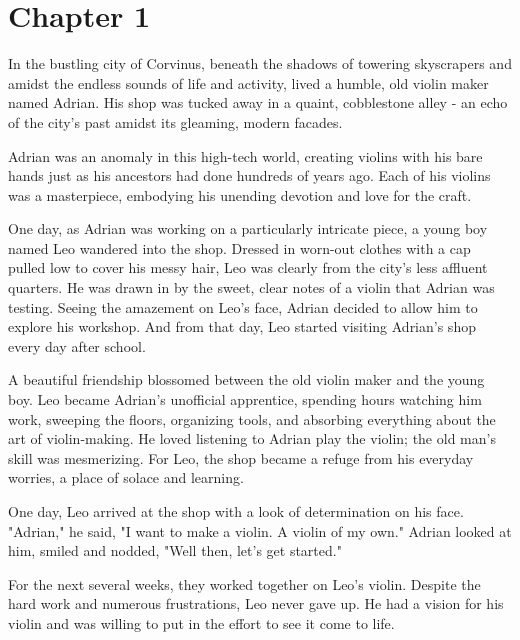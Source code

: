 \section{Chapter 1}
In the bustling city of Corvinus, beneath the shadows of towering skyscrapers and amidst the endless sounds of life and activity, lived a humble, old violin maker named Adrian. His shop was tucked away in a quaint, cobblestone alley - an echo of the city’s past amidst its gleaming, modern facades.

Adrian was an anomaly in this high-tech world, creating violins with his bare hands just as his ancestors had done hundreds of years ago. Each of his violins was a masterpiece, embodying his unending devotion and love for the craft.

One day, as Adrian was working on a particularly intricate piece, a young boy named Leo wandered into the shop. Dressed in worn-out clothes with a cap pulled low to cover his messy hair, Leo was clearly from the city's less affluent quarters. He was drawn in by the sweet, clear notes of a violin that Adrian was testing. Seeing the amazement on Leo's face, Adrian decided to allow him to explore his workshop. And from that day, Leo started visiting Adrian’s shop every day after school.

A beautiful friendship blossomed between the old violin maker and the young boy. Leo became Adrian's unofficial apprentice, spending hours watching him work, sweeping the floors, organizing tools, and absorbing everything about the art of violin-making. He loved listening to Adrian play the violin; the old man's skill was mesmerizing. For Leo, the shop became a refuge from his everyday worries, a place of solace and learning.

One day, Leo arrived at the shop with a look of determination on his face. "Adrian," he said, "I want to make a violin. A violin of my own." Adrian looked at him, smiled and nodded, "Well then, let's get started."

For the next several weeks, they worked together on Leo's violin. Despite the hard work and numerous frustrations, Leo never gave up. He had a vision for his violin and was willing to put in the effort to see it come to life.

